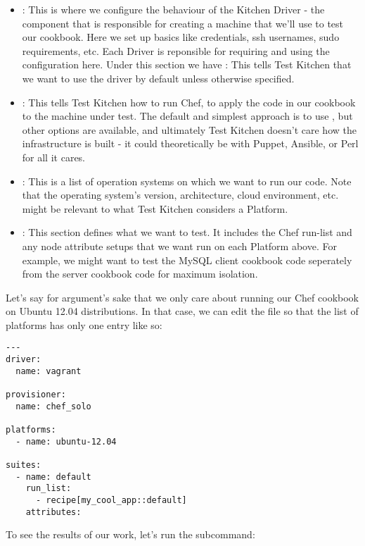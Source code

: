 \begin{itemize}
  \item {}: This is where we configure the behaviour of the Kitchen Driver - the component that is responsible for creating a machine that we'll use to test our cookbook. Here we set up basics like credentials, ssh usernames, sudo requirements, etc. Each Driver is reponsible for requiring and using the configuration here. Under this section we have : This tells Test Kitchen that we want to use the  driver by default unless otherwise specified.
  \item {}: This tells Test Kitchen how to run Chef, to apply the code in our cookbook to the machine under test. The default and simplest approach is to use , but other options are available, and ultimately Test Kitchen doesn't care how the infrastructure is built - it could theoretically be with Puppet, Ansible, or Perl for all it cares.
  \item {}: This is a list of operation systems on which we want to run our code. Note that the operating system's version, architecture, cloud environment, etc. might be relevant to what Test Kitchen considers a Platform.
  \item {}: This section defines what we want to test. It includes the Chef run-list and any node attribute setups that we want run on each Platform above. For example, we might want to test the MySQL client cookbook code seperately from the server cookbook code for maximum isolation.
\end{itemize}

Let's say for argument's sake that we only care about running our Chef cookbook on Ubuntu 12.04 distributions. In that case, we can edit the  file so that the list of platforms has only one entry like so:

\begin{lstlisting}[label=lst:testing-test-kitchen5]
---
driver:
  name: vagrant

provisioner:
  name: chef_solo

platforms:
  - name: ubuntu-12.04

suites:
  - name: default
    run_list:
      - recipe[my_cool_app::default]
    attributes:
\end{lstlisting}

To see the results of our work, let's run the  subcommand:

